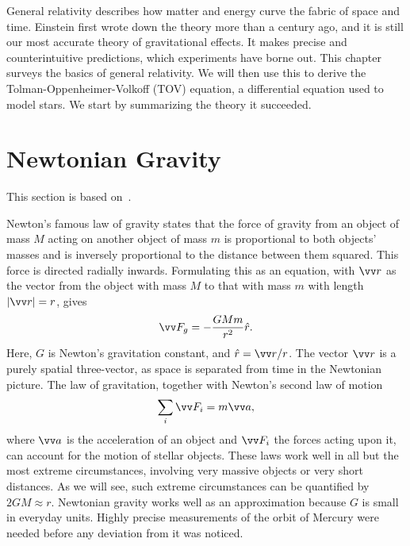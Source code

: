 General relativity describes how matter and energy curve the fabric of space and time.
Einstein first wrote down the theory more than a century ago, and it is still our most accurate theory of gravitational effects.
It makes precise and counterintuitive predictions, which experiments have borne out.
This chapter surveys the basics of general relativity.
We will then use this to derive the Tolman-Oppenheimer-Volkoff (TOV) equation, a differential equation used to model stars.
We start by summarizing the theory it succeeded.


\section{Newtonian Gravity}

This section is based on~\autocite{carrollSpacetimeGeometryIntroduction2019}.


Newton's famous law of gravity states that the force of gravity from an object of mass $M$ acting on another object of mass $m$ is proportional to both objects' masses and is inversely proportional to the distance between them squared.
This force is directed radially inwards.
Formulating this as an equation, with $\vv r$ as the vector from the object with mass $M$ to that with mass $m$ with length $|\vv r| = r$, gives
%
\begin{equation}
    \vv F_g = - \frac{G M m}{r^2} \hat r.
\end{equation}
%
Here, $G$ is Newton's gravitation constant, and $\hat r = \vv r / r$.
The vector $\vv r$ is a purely spatial three-vector, as space is separated from time in the Newtonian picture.
The law of gravitation, together with Newton's second law of motion
%
\begin{equation}
    \label{Newton's second law}
    \sum_i \vv F_i = m \vv a,
\end{equation}
%
where $\vv a$ is the acceleration of an object and $\vv F_i$ the forces acting upon it, can account for the motion of stellar objects.
These laws work well in all but the most extreme circumstances, involving very massive objects or very short distances.
As we will see, such extreme circumstances can be quantified by $2G M \approx r$.
Newtonian gravity works well as an approximation because $G$ is small in everyday units.
Highly precise measurements of the orbit of Mercury were needed before any deviation from it was noticed.


